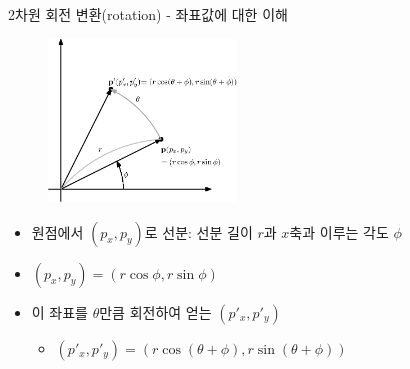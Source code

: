 \documentclass{beamer}
\begin{document}
\begin{frame}{2차원 회전 변환(rotation) - 좌표값에 대한 이해}

\begin{figure}
    \includegraphics[width=5cm]{Math_transform/rotation.eps}
\end{figure}

\begin{itemize}
\item 원점에서 $(p_x,p_y)$로 선분: 선분 길이 $r$과 $x$축과 이루는 각도 $\phi$
\item $(p_x, p_y) = (r \cos \phi,  r \sin \phi)$
\item 이 좌표를 $\theta$만큼 회전하여 얻는 $(p'_x , p'_y)$
	\begin{itemize}
	\item $(p'_x, p'_y) =  ( r \cos (\theta+ \phi) , r \sin (\theta + \phi) )$
	\end{itemize}
\end{itemize}

\end{frame}
\end{document}
